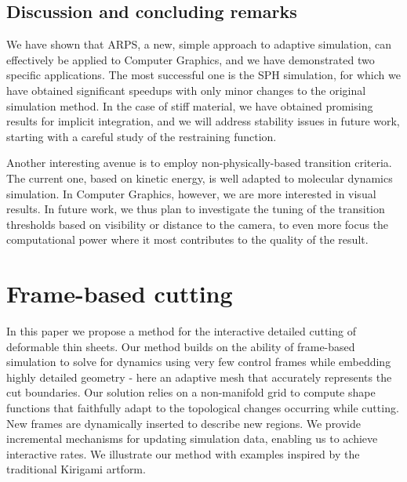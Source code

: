 \documentclass[11pt, oneside, a4paper]{memoir}
\begin{document}
\section{Discussion and concluding remarks} \label{sec discussion}
We have shown that ARPS, a new, simple approach to adaptive simulation, can effectively be applied to Computer Graphics, and we have demonstrated two specific applications.
The most successful one is the SPH simulation, for which we have obtained significant speedups with only minor changes to the original simulation method.
In the case of stiff material, we have obtained promising results for implicit integration, and we will address stability issues in future work, starting with a careful study of the restraining function.

Another interesting avenue is to employ non-physically-based transition criteria. The current one, based on kinetic energy, is well adapted to molecular dynamics simulation. In Computer Graphics, however, we are more interested in visual results. In future work, we thus plan to investigate the tuning of the transition thresholds based on visibility or distance to the camera, to even more focus the computational power where it most contributes to the quality of the result.

\chapter{Frame-based cutting}



In this paper we propose a method for the interactive detailed cutting of deformable thin sheets. Our method builds on the ability of frame-based simulation to solve for dynamics using very few control frames while embedding highly detailed geometry - here an adaptive mesh that accurately represents the cut boundaries.
Our solution relies on a non-manifold grid to compute shape functions that faithfully adapt to the topological changes occurring while cutting.  New frames are dynamically inserted to describe new regions. We provide incremental mechanisms for updating simulation data, enabling us to achieve interactive rates. We illustrate our method with examples inspired by the traditional Kirigami artform.

\end{document}
